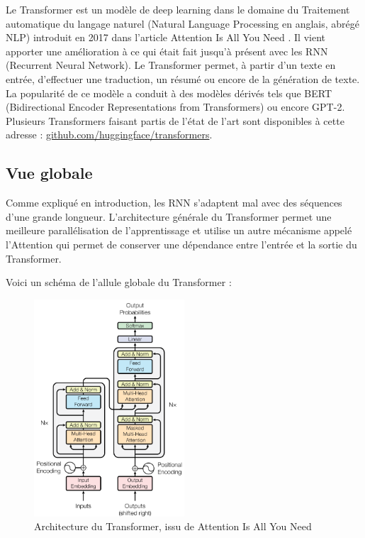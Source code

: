 Le \og Transformer \fg{} est un modèle de deep learning dans le domaine du Traitement automatique du langage naturel (Natural Language Processing en anglais, abrégé NLP)
introduit en 2017 dans l'article \og Attention Is All You Need \fg{}\cite{vaswani2017attention}. 
Il vient apporter une amélioration à ce qui était fait jusqu'à présent avec les RNN (Recurrent Neural Network). 
Le Transformer permet, à partir d'un texte en entrée, d'effectuer une traduction, un résumé ou encore de la génération de texte. \\

La popularité de ce modèle a conduit à des modèles dérivés tels que 
BERT (Bidirectional Encoder Representations from Transformers)\cite{devlin2018bert} ou encore GPT-2\cite{radford2019gpt2}.
Plusieurs Transformers faisant partis de l'état de l'art sont disponibles à cette adresse : \href{https://github.com/huggingface/transformers}{github.com/huggingface/transformers}.

\subsection{Vue globale}

Comme expliqué en introduction, les RNN s'adaptent mal avec des séquences d'une grande longueur. 
L'architecture générale du Transformer permet une meilleure parallélisation de l'apprentissage et utilise un autre mécanisme appelé \og l'Attention \fg{} qui permet
de conserver une dépendance entre l'entrée et la sortie du Transformer.

Voici un schéma de l'allule globale du Transformer :
\begin{figure}[h]
  \begin{center}
  \includegraphics[width=0.5\textwidth]{img/architecture_transformer.png}
  \end{center}
  \caption{Architecture du Transformer, issu de \og Attention Is All You Need \fg{}\cite{vaswani2017attention}}
  \label{fig:transformer}
\end{figure}


